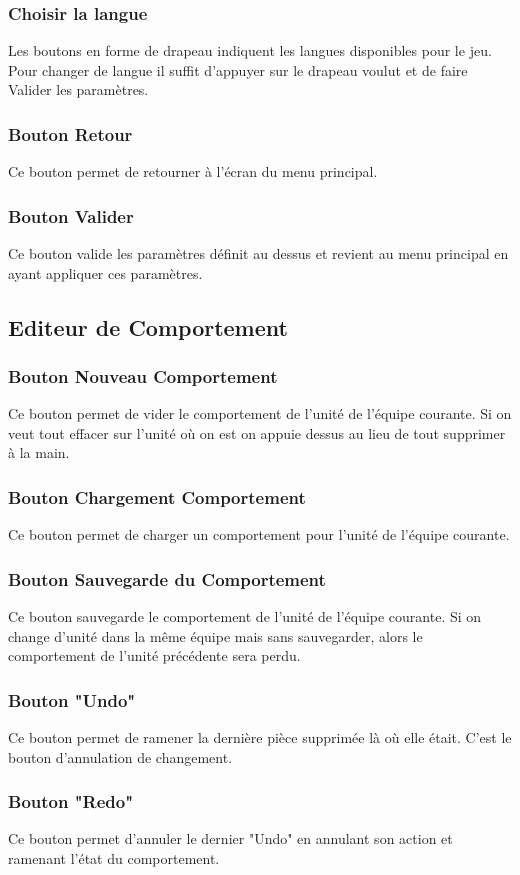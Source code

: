 \documentclass{report}
\begin{document}
\subsubsection{Choisir la langue}
Les boutons en forme de drapeau indiquent les langues disponibles pour le jeu. Pour changer de langue il suffit d'appuyer sur le drapeau voulut et de faire Valider les paramètres.
\subsubsection{Bouton Retour}
Ce bouton permet de retourner à l'écran du menu principal.
\subsubsection{Bouton Valider}
Ce bouton valide les paramètres définit au dessus et revient au menu principal en ayant appliquer ces paramètres.

\subsection{Editeur de Comportement}
\subsubsection{Bouton Nouveau Comportement}
Ce bouton permet de vider le comportement de l'unité de l'équipe courante. Si on veut tout effacer sur l'unité où on est on appuie dessus au lieu de tout supprimer à la main.
\subsubsection{Bouton Chargement Comportement}
Ce bouton permet de charger un comportement pour l'unité de l'équipe courante.
\subsubsection{Bouton Sauvegarde du Comportement}
Ce bouton sauvegarde le comportement de l'unité de l'équipe courante. Si on change d'unité dans la même équipe mais sans sauvegarder, alors le comportement de l'unité précédente sera perdu.
\subsubsection{Bouton "Undo"}
Ce bouton permet de ramener la dernière pièce supprimée là où elle était. C'est le bouton d'annulation de changement.
\subsubsection{Bouton "Redo"}
Ce bouton permet d'annuler le dernier "Undo" en annulant son action et ramenant l'état du comportement.
\end{document}
